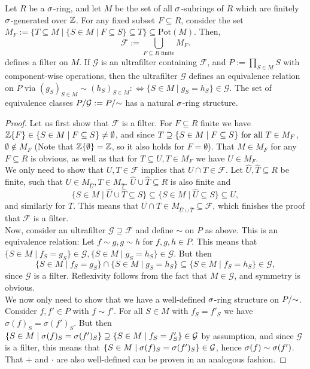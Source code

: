 \begin{lem}\label{lemmafilters}
Let $R$ be a $\sigma$-ring, and let $M$ be the set of all $\sigma$-subrings of $R$ which are finitely $\sigma$-generated over $\mathbb{Z}$. For any fixed subset $F \subseteq R$, consider the set $M_F:= \{ T \subseteq M \mid \{S \in M \mid F \subseteq S \} \subseteq T \} \subseteq \text{Pot}(M)$. 
Then, \[ \mathcal{F}:= \bigcup_{ F \subseteq R \text{ finite} } M_F. \]
 defines a filter on $M$. If $\mathcal{G}$ is an ultrafilter containing $\mathcal{F}$, and $P:= \prod_{S \in M} S$ with component-wise operations,
 then the ultrafilter $\mathcal{G}$ defines an equivalence relation on $P$ via $(g_S)_{S \in M} \sim (h_S)_{S \in M} : \Leftrightarrow \{ S \in M \mid g_S = h_S \} \in \mathcal{G}$. 
The set of equivalence classes $P/\mathcal{G}:= P/\mathord{\sim}$ has a natural $\sigma$-ring structure. %
\begin{proof}
Let us first show that $\mathcal{F}$ is a filter. For $F \subseteq R$ finite we have $\mathbb{Z}\{F\} \in \{ S \in M \mid F \subseteq S \} \neq \emptyset$, and since $T \supseteq \{ S \in M \mid F \subseteq S \} \text{ for all } T \in M_F$, $\emptyset \notin M_F$ (Note that $\mathbb{Z}\{\emptyset\} = \mathbb{Z}$, so it also holds for $F = \emptyset$).
  That $M \in M_F$ for any $F \subseteq R$ is obvious, as well as that for $T \subseteq U, T \in M_F$ we have $U \in M_F$. \\ 
\indent We only need to show that $U,T \in \mathcal{F}$ implies that $U \cap T \in \mathcal{F}$.
  Let $\hat U, \hat T \subseteq R$ be finite, such that $U \in M_{\hat U}, T \in M_{\hat T}$. $\hat U \cup \hat T \subseteq R$ is also finite and $$\{ S \in M \mid \hat U \cup \hat T \subseteq S \} \subseteq \{ S \in M \mid \hat U \subseteq S \} \subseteq U,$$
 and similarly for $T$. This means that $U \cap T \in M_{\hat U \cup \hat T} \subseteq \mathcal{F}$, which finishes the proof that $\mathcal{F}$ is a filter. \\

 Now, consider an ultrafilter $\mathcal{G} \supseteq \mathcal{F}$ and define $\sim$ on $P$ as above. This is an equivalence relation: Let $f \sim g, g \sim h$ for $f,g,h \in P$. 
 This means that $\{ S \in M \mid f_S = g_S \} \in \mathcal{G}, \{ S \in M \mid g_S = h_S \} \in \mathcal{G}$. But then $$\{ S \in M \mid f_S = g_S \} \cap \{ S \in M \mid g_S = h_S \} \subseteq \{ S \in M \mid f_S = h_S \} \in \mathcal{G},$$
 since $\mathcal{G}$ is a filter.
 Reflexivity follows from the fact that $M \in \mathcal{G}$, and symmetry is obvious. \\
\indent  We now only need to show that we have a well-defined $\sigma$-ring structure on $P/\mathord{\sim}$.
 Consider $f,f' \in P$ with $f \sim f'$. For all $S \in M$ with $f_S = f'_S$  we have $\sigma(f)_S = \sigma(f')_S$. 
 But then $\{ S \in M \mid \sigma(f)_S = \sigma(f')_S \} \supseteq \{ S \in M \mid f_S = f'_S \} \in \mathcal{G}$ by assumption, and since $\mathcal{G}$ is a filter, this means that $\{ S \in M \mid \sigma(f)_S = \sigma(f')_S \} \in \mathcal{G}$,
 hence $\sigma(f) \sim \sigma(f')$. That $+$ and $\cdot$ are also well-defined can be proven in an analogous fashion.
\end{proof}
\end{lem}

